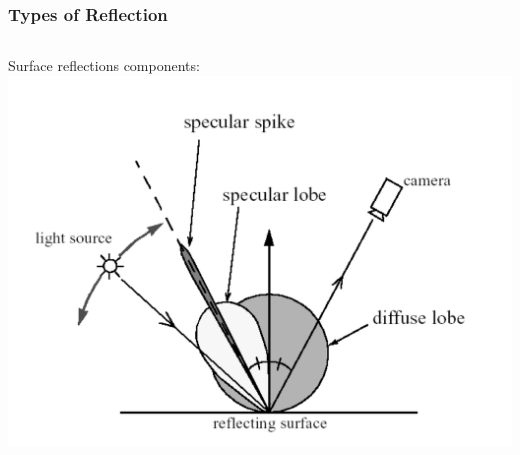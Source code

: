 \documentclass[xcolor=x11names, compress, handout]{beamer}
\renewcommand{\(}{\begin{columns}}
\renewcommand{\)}{\end{columns}}
\newcommand{\<}[1]{\begin{column}{#1}}
\renewcommand{\>}{\end{column}}
\begin{document}
\begin{frame}
\frametitle{Types of Reflection}


\begin{columns}
\begin{column}{0.4\textwidth}
\scriptsize
Surface reflections components: \\
\centering
\includegraphics[width=\textwidth]{images/surface_reflection.png}


\end{column}
\end{columns}
\end{frame}
\end{document}
